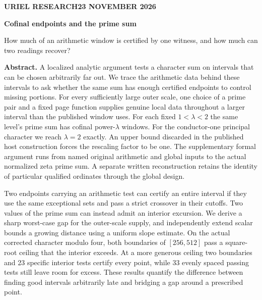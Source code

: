 \documentclass[12pt,letterpaper]{article}
\begin{document}
\thispagestyle{plain}
{\sffamily\small\bfseries\color{accent}URIEL RESEARCH\hfill 23 NOVEMBER 2026}\par\vspace{13pt}
{\Huge\bfseries\color{ink}Cofinal endpoints and the prime sum\par}\vspace{7pt}
{\Large\color{mute}How much of an arithmetic window is certified by one witness, and how much can two readings recover?\par}\vspace{14pt}
\textbf{Abstract.} A localized analytic argument tests a character sum on intervals that can be chosen arbitrarily far out. We trace the arithmetic data behind these intervals to ask whether the same sum has enough certified endpoints to control missing portions. For every sufficiently large outer scale, one choice of a prime pair and a fixed page function supplies genuine local data throughout a larger interval than the published window uses. For each fixed \(1<\lambda<2\) the same level's prime sum has cofinal power-\(\lambda\) windows. For the conductor-one principal character we reach \(\lambda=2\) exactly. An upper bound discarded in the published host construction forces the rescaling factor to be one. The supplementary formal argument runs from named original arithmetic and global inputs to the actual normalized zeta prime sum. A separate written reconstruction retains the identity of particular qualified ordinates through the global design.

Two endpoints carrying an arithmetic test can certify an entire interval if they use the same exceptional sets and pass a strict crossover in their cutoffs. Two values of the prime sum can instead admit an interior excursion. We derive a sharp worst-case gap for the outer-scale supply, and independently extend scalar bounds a growing distance using a uniform slope estimate. On the actual corrected character modulo four, both boundaries of \([256,512]\) pass a square-root ceiling that the interior exceeds. At a more generous ceiling two boundaries and 23 specific interior tests certify every point, while 33 evenly spaced passing tests still leave room for excess. These results quantify the difference between finding good intervals arbitrarily late and bridging a gap around a prescribed point.
\end{document}
